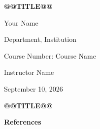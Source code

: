 \documentclass[12pt,letterpaper]{article}
\makeatletter
\newcommand{\paperTitle}{@@TITLE@@}
\newcommand{\studentName}{Your Name}
\newcommand{\courseName}{Course Number: Course Name}
\newcommand{\instructorName}{Instructor Name}
\newcommand{\affiliation}{Department, Institution}
\newcommand{\dueDate}{September 10, 2026}
\newcommand{\levelone}[1]{\par{\centering\bfseries #1\par}}
\makeatother
\begin{document}
\raggedright
\setlength{\parindent}{0.5in}
\vspace*{2\baselineskip}
{\centering
\textbf{\paperTitle}\par
\vspace{\baselineskip}
\studentName\par
\affiliation\par
\courseName\par
\instructorName\par
\dueDate\par}
\clearpage
\levelone{\paperTitle}

\clearpage
\levelone{References}

\end{document}
